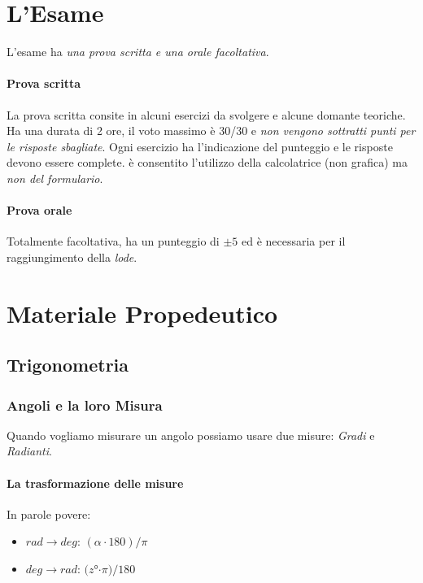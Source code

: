 \documentclass[12pt, a4paper, openany]{book}
\begin{document}
\section{L'Esame}
L'esame ha \emph{una prova scritta e una orale facoltativa}.
\paragraph*{Prova scritta}
La prova scritta consite in alcuni esercizi da svolgere e alcune domante teoriche.
Ha una durata di 2 ore, il voto massimo è 30/30 e \emph{non vengono sottratti punti per le risposte sbagliate}.
Ogni esercizio ha l'indicazione del punteggio e le risposte devono essere complete.
è consentito l'utilizzo della calcolatrice (non grafica) ma \emph{non del formulario}.
\paragraph*{Prova orale}
Totalmente facoltativa, ha un punteggio di $\pm 5$ ed è necessaria per il raggiungimento della \emph{lode}.

\section{Materiale Propedeutico}
\subsection{Trigonometria}
\subsubsection*{Angoli e la loro Misura}
Quando vogliamo misurare un angolo possiamo usare due misure: \emph{Gradi} e \emph{Radianti}.
\paragraph*{La trasformazione delle misure}
In parole povere:
\begin{itemize}
    \item $rad \to deg$: $(\alpha \cdot 180)/\pi$
    \item $deg \to rad$: $(z$°$ \cdot \pi)/180$
\end{itemize}
\end{document}
